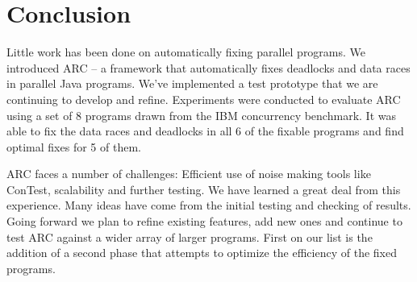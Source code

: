 \section{Conclusion}
\label{sec:conclusion}

Little work has been done on automatically fixing parallel programs. We
introduced ARC -- a framework that automatically fixes deadlocks and data races
in parallel Java programs. We've implemented a test prototype that we are
continuing to develop and refine.  Experiments were conducted to evaluate ARC
using a set of 8 programs drawn from the IBM concurrency benchmark. It was able to
fix the data races and deadlocks in all 6 of the fixable programs and find optimal fixes
for 5 of them.  

ARC faces a number of challenges: Efficient use of noise making tools like ConTest,
scalability and further testing.   We have learned a great deal from this experience. 
Many ideas have come from the
initial testing and checking of results. Going forward we plan to refine existing 
features, add new ones and continue to test ARC against a wider array of larger 
programs.  First on our list is the addition of  a second phase that attempts to 
optimize the efficiency of the fixed programs.
